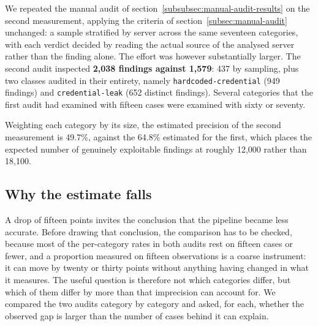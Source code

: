 We repeated the manual audit of
section~\ref{subsubsec:manual-audit-results} on the second measurement, applying
the criteria of section~\ref{subsec:manual-audit} unchanged: a sample stratified
by server across the same seventeen categories, with each verdict decided by
reading the actual source of the analysed server rather than the finding alone.
The effort was however substantially larger. The second audit inspected
\textbf{2,038 findings against 1,579}: 437 by sampling, plus two classes audited
in their entirety, namely \texttt{hardcoded-credential} (949 findings) and
\texttt{credential-leak} (652 distinct findings). Several categories that the
first audit had examined with fifteen cases were examined with sixty or seventy.

Weighting each category by its size, the estimated precision of the second
measurement is 49.7\%, against the 64.8\% estimated for the first, which places
the expected number of genuinely exploitable findings at roughly 12,000 rather
than 18,100.

\subsection{Why the estimate falls}
\label{sec:long:stats}

A drop of fifteen points invites the conclusion that the pipeline became less
accurate. Before drawing that conclusion, the comparison has to be checked,
because most of the per-category rates in both audits rest on fifteen cases or
fewer, and a proportion measured on fifteen observations is a coarse instrument:
it can move by twenty or thirty points without anything having changed in what it
measures. The useful question is therefore not which categories differ, but which
of them differ by more than that imprecision can account for. We compared the two
audits category by category and asked, for each, whether the observed gap is
larger than the number of cases behind it can explain.

